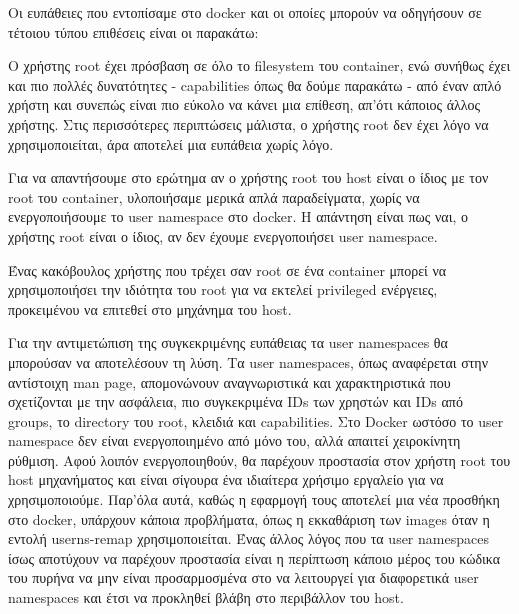 Οι ευπάθειες που εντοπίσαμε στο \en docker\gr{} και οι οποίες μπορούν να οδηγήσουν σε τέτοιου τύπου επιθέσεις είναι οι παρακάτω:
\begin{description}[style=nextline]
\item[Χρήση του \en root\gr{} μέσα σε \en containers]
Ο χρήστης \en root\gr{} έχει πρόσβαση σε όλο το \en filesystem\gr{} του \en container\gr{}, ενώ συνήθως έχει και πιο πολλές δυνατότητες - \en capabilities\gr{} όπως θα δούμε παρακάτω - από έναν απλό χρήστη και συνεπώς είναι πιο εύκολο να κάνει μια επίθεση, απ'ότι κάποιος άλλος χρήστης. Στις περισσότερες περιπτώσεις μάλιστα, ο χρήστης \en root\gr{} δεν έχει λόγο να χρησιμοποιείται, άρα αποτελεί μια ευπάθεια χωρίς λόγο.

Για να απαντήσουμε στο ερώτημα αν ο χρήστης \en root\gr{} του \en host\gr{} είναι ο ίδιος με τον \en root\gr{} του \en container\gr{}, υλοποιήσαμε μερικά απλά παραδείγματα, χωρίς να ενεργοποιήσουμε το \en user namespace\gr{} στο \en docker\gr{}. Η απάντηση είναι πως ναι, ο χρήστης \en root\gr{} είναι ο ίδιος, αν δεν έχουμε ενεργοποιήσει \en user namespace\gr{}.

Ένας κακόβουλος χρήστης που τρέχει σαν \en root\gr{} σε ένα \en container\gr{} μπορεί να χρησιμοποιήσει την ιδιότητα του \en root\gr{} για να εκτελεί \en privileged\gr{} ενέργειες, προκειμένου να επιτεθεί στο μηχάνημα του \en host\gr{}.

Για την αντιμετώπιση της συγκεκριμένης ευπάθειας τα \en user namespaces\gr{} θα μπορούσαν να αποτελέσουν τη λύση. Τα \en user namespaces\gr{}, όπως αναφέρεται στην αντίστοιχη \en man page\gr{}, απομονώνουν αναγνωριστικά και χαρακτηριστικά που σχετίζονται με την ασφάλεια, πιο συγκεκριμένα \en IDs\gr{} των χρηστών και \en IDs\gr{} από \en groups\gr{}, το \en directory\gr{} του \en root\gr{}, κλειδιά και \en capabilities\gr{}. Στο \en Docker\gr{} ωστόσο το \en user namespace\gr{} δεν είναι ενεργοποιημένο από μόνο του, αλλά απαιτεί χειροκίνητη ρύθμιση. Αφού λοιπόν ενεργοποιηθούν, θα παρέχουν προστασία στον χρήστη \en root\gr{} του \en host\gr{} μηχανήματος και είναι σίγουρα ένα ιδιαίτερα χρήσιμο εργαλείο για να χρησιμοποιούμε. Παρ'όλα αυτά, καθώς η εφαρμογή τους αποτελεί μια νέα προσθήκη στο \en docker\gr{}, υπάρχουν κάποια προβλήματα, όπως η εκκαθάριση των \en images\gr{} όταν η εντολή \en userns-remap\gr{} χρησιμοποιείται. Ένας άλλος λόγος που τα \en user namespaces\gr{} ίσως αποτύχουν να παρέχουν προστασία είναι η περίπτωση κάποιο μέρος του κώδικα του πυρήνα να μην είναι προσαρμοσμένα στο να λειτουργεί για διαφορετικά \en user namespaces\gr{} και έτσι να προκληθεί βλάβη στο περιβάλλον του \en host\gr{}.


\end{description}
